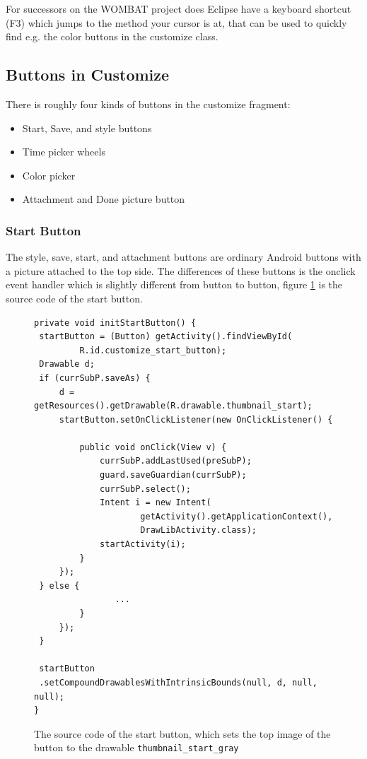 For successors on the WOMBAT project does Eclipse have a keyboard shortcut (F3) which jumps to the method your cursor is at, that can be used to quickly find e.g. the color buttons in the customize class.

\subsection{Buttons in Customize}
There is roughly four kinds of buttons in the customize fragment:

\begin{itemize}
	\item Start, Save, and style buttons
	\item Time picker wheels
	\item Color picker
	\item Attachment and Done picture button
\end{itemize}

\subsubsection*{Start Button}
The style, save, start, and attachment buttons are ordinary Android buttons with a picture attached to the top side.
The differences of these buttons is the onclick event handler which is slightly different from button to button, figure \ref{code:customize:start_button} is the source code of the start button.

\begin{figure}[H]
\begin{lstlisting}
private void initStartButton() {
 startButton = (Button) getActivity().findViewById(
		 R.id.customize_start_button);
 Drawable d;
 if (currSubP.saveAs) {
	 d = getResources().getDrawable(R.drawable.thumbnail_start);
	 startButton.setOnClickListener(new OnClickListener() {

		 public void onClick(View v) {
			 currSubP.addLastUsed(preSubP);
			 guard.saveGuardian(currSubP);
			 currSubP.select();
			 Intent i = new Intent(
					 getActivity().getApplicationContext(),
					 DrawLibActivity.class);
			 startActivity(i);
		 }
	 });
 } else {
				...
		 }
	 });
 }

 startButton
 .setCompoundDrawablesWithIntrinsicBounds(null, d, null, null);
}
\end{lstlisting}
\caption{The source code of the start button, which sets the top image of the button to the drawable \tt thumbnail\_start\_gray}%
\label{code:customize:start_button}%
\end{figure}

